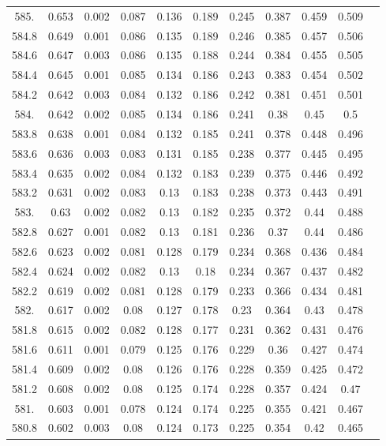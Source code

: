 \documentclass[12pt]{ctexart}
\numberwithin{equation}{section}
\begin{document}
\begin{longtable}{ccccccccccc}
585.	&	0.653	&	0.002	&	0.087	&	0.136	&	0.189	&	0.245	&	0.387	&	0.459	&	0.509	\\
584.8	&	0.649	&	0.001	&	0.086	&	0.135	&	0.189	&	0.246	&	0.385	&	0.457	&	0.506	\\
584.6	&	0.647	&	0.003	&	0.086	&	0.135	&	0.188	&	0.244	&	0.384	&	0.455	&	0.505	\\
584.4	&	0.645	&	0.001	&	0.085	&	0.134	&	0.186	&	0.243	&	0.383	&	0.454	&	0.502	\\
584.2	&	0.642	&	0.003	&	0.084	&	0.132	&	0.186	&	0.242	&	0.381	&	0.451	&	0.501	\\
584.	&	0.642	&	0.002	&	0.085	&	0.134	&	0.186	&	0.241	&	0.38	&	0.45	&	0.5	\\
583.8	&	0.638	&	0.001	&	0.084	&	0.132	&	0.185	&	0.241	&	0.378	&	0.448	&	0.496	\\
583.6	&	0.636	&	0.003	&	0.083	&	0.131	&	0.185	&	0.238	&	0.377	&	0.445	&	0.495	\\
583.4	&	0.635	&	0.002	&	0.084	&	0.132	&	0.183	&	0.239	&	0.375	&	0.446	&	0.492	\\
583.2	&	0.631	&	0.002	&	0.083	&	0.13	&	0.183	&	0.238	&	0.373	&	0.443	&	0.491	\\
583.	&	0.63	&	0.002	&	0.082	&	0.13	&	0.182	&	0.235	&	0.372	&	0.44	&	0.488	\\
582.8	&	0.627	&	0.001	&	0.082	&	0.13	&	0.181	&	0.236	&	0.37	&	0.44	&	0.486	\\
582.6	&	0.623	&	0.002	&	0.081	&	0.128	&	0.179	&	0.234	&	0.368	&	0.436	&	0.484	\\
582.4	&	0.624	&	0.002	&	0.082	&	0.13	&	0.18	&	0.234	&	0.367	&	0.437	&	0.482	\\
582.2	&	0.619	&	0.002	&	0.081	&	0.128	&	0.179	&	0.233	&	0.366	&	0.434	&	0.481	\\
582.	&	0.617	&	0.002	&	0.08	&	0.127	&	0.178	&	0.23	&	0.364	&	0.43	&	0.478	\\
581.8	&	0.615	&	0.002	&	0.082	&	0.128	&	0.177	&	0.231	&	0.362	&	0.431	&	0.476	\\
581.6	&	0.611	&	0.001	&	0.079	&	0.125	&	0.176	&	0.229	&	0.36	&	0.427	&	0.474	\\
581.4	&	0.609	&	0.002	&	0.08	&	0.126	&	0.176	&	0.228	&	0.359	&	0.425	&	0.472	\\
581.2	&	0.608	&	0.002	&	0.08	&	0.125	&	0.174	&	0.228	&	0.357	&	0.424	&	0.47	\\
581.	&	0.603	&	0.001	&	0.078	&	0.124	&	0.174	&	0.225	&	0.355	&	0.421	&	0.467	\\
580.8	&	0.602	&	0.003	&	0.08	&	0.124	&	0.173	&	0.225	&	0.354	&	0.42	&	0.465	\\

\end{longtable}
\end{document}
